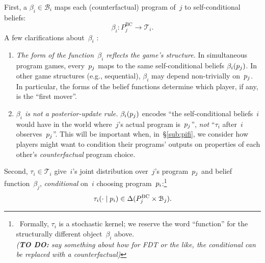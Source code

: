 \documentclass[sigconf]{aamas}
\theoremstyle{definition}
\newcommand{\bcprogspacej}{P^{\mathrm{BC}}_j}
\newcommand{\beliefspacei}{\mathcal{B}_i}       %
\newcommand{\beliefspacej}{\mathcal{B}_j}       %
\newcommand{\scbspacei}{\mathcal{T}_i}          %
\begin{document}
First, a  $\beta_i \in \beliefspacei$ maps each (counterfactual) program of~$j$ to
self-conditional beliefs:
$$
\beta_i : \bcprogspacej \to \scbspacei.
$$
A few clarifications about~$\beta_i$ :
\begin{enumerate}
    \item \emph{The form of the function~$\beta_i$ reflects the game's structure.}
    In simultaneous program games, every~$p_j$ maps to the same self-conditional beliefs $\beta_i(p_j)$.
    In other game structures (e.g., sequential), $\beta_i$ may depend non-trivially on~$p_j$. In particular, the forms of the belief functions determine which player, if any, is the “first mover''.    
    \item \emph{$\beta_i$ is not a posterior-update rule.}
    $\beta_i(p_j)$ encodes ``the self-conditional beliefs~$i$ would have in the world where~$j$'s actual program is~$p_j$'', \emph{not} ``$\tau_i$ after~$i$ observes~$p_j$''.
    This will be important when, in~\S\ref{sub:pifi}, we consider how players might want to condition their programs' outputs on properties of each other's \textit{counterfactual} program choice.
\end{enumerate}

Second,  $\tau_i \in \scbspacei$ give~$i$'s joint distribution over~$j$'s program~$p_j$ and belief function~$\beta_j$, \textit{conditional} on~$i$ choosing program~$p_i$:\footnote{\ Formally, $\tau_i$ is a stochastic kernel; we reserve the word ``function'' for the structurally different object~$\beta_i$ above.
\\ \textit{(\textbf{TO DO:} say something about how for FDT or the like, the conditional can be replaced with a counterfactual)}}
$$
\tau_i(\cdot \mid \progi) \in \Delta(\bcprogspacej \times \beliefspacej).
$$
\end{document}
